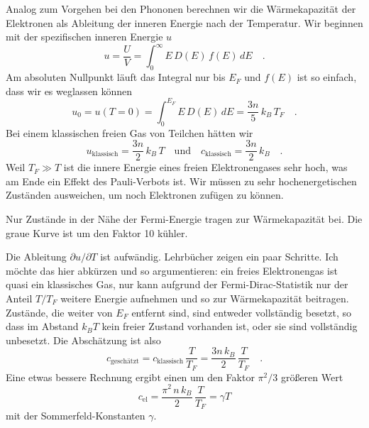 Analog zum Vorgehen bei den Phononen berechnen wir die Wärmekapazität der Elektronen als Ableitung der inneren Energie nach der Temperatur. Wir beginnen mit der spezifischen inneren Energie $u$
\begin{equation}
    u = \frac{U}{V} = \int_0^\infty E \, D(E) \, f(E) \,  dE \quad .
\end{equation}
Am absoluten Nullpunkt läuft das Integral nur bis $E_F$ und $f(E)$ ist so einfach, dass wir es weglassen können
\begin{equation}
    u_0 = u(T=0) = \int_0^{E_F} E \, D(E) \, dE = \frac{3n}{5} \, k_B \, T_F \quad .
\end{equation}
Bei einem klassischen freien Gas von Teilchen hätten wir 
\begin{equation}
    u_\text{klassisch} = \frac{3 n}{2} \, k_B \, T \quad \text{und} \quad c_\text{klassisch} = \frac{3 n}{2} \, k_B  \quad .
\end{equation}
Weil $T_F \gg T$ ist die innere Energie eines freien Elektronengases sehr hoch, was am Ende ein Effekt des Pauli-Verbots ist. Wir müssen zu sehr hochenergetischen Zuständen ausweichen, um noch Elektronen zufügen zu können.

\begin{marginfigure}
    \caption{Nur Zustände in der Nähe der Fermi-Energie tragen zur Wärmekapazität bei. Die graue Kurve ist um den Faktor 10 kühler.}
    \label{fig:2_fermi_dirac_T}
\end{marginfigure}


Die Ableitung $\partial u / \partial T$ ist aufwändig. Lehrbücher zeigen ein paar Schritte. Ich möchte das hier abkürzen und so argumentieren: ein freies Elektronengas ist quasi ein klassisches Gas, nur kann aufgrund der Fermi-Dirac-Statistik nur der Anteil $T/T_F$ weitere Energie aufnehmen und so zur Wärmekapazität beitragen. Zustände, die weiter von $E_F$ entfernt sind, sind entweder vollständig besetzt, so dass im Abstand $k_B T$ kein freier Zustand vorhanden ist, oder sie sind vollständig unbesetzt. Die Abschätzung ist also
\begin{equation}
    c_\text{geschätzt} = c_\text{klassisch}  \, \frac{T}{T_F} = \frac{3 n \, k_B}{2}  \, \frac{T}{T_F} \quad .
\end{equation}
Eine etwas bessere Rechnung ergibt einen um den Faktor $\pi^2/3$ größeren Wert
\begin{equation}
    c_\text{el} = \frac{\pi^2 \, n \, k_B}{2}  \, \frac{T}{T_F} = \gamma T \label{eq:2_WK_elek}
\end{equation}
mit der Sommerfeld-Konstanten $\gamma$.



